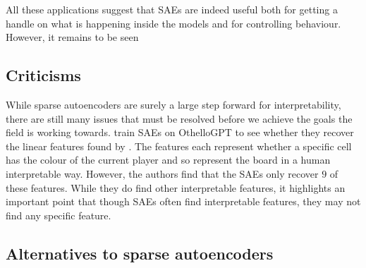 \documentclass[../../main.tex]{subfiles}
\begin{document}
All these applications suggest that SAEs are indeed useful both for getting a handle on what is happening inside the models and for controlling behaviour.
However, it remains to be seen 



\subsection{Criticisms}
While sparse autoencoders are surely a large step forward for interpretability, there are still many issues that must be resolved before we achieve the goals the field is working towards.
\citet{robert_huben_research_2024} train SAEs on OthelloGPT \citep{li_emergent_2023} to see whether they recover the linear features found by \citet{neel_nanda_actually_2023}.
The features each represent whether a specific cell has the colour of the current player and so represent the board in a human interpretable way.
However, the authors find that the SAEs only recover $9$ of these features.
While they do find other interpretable features, it highlights an important point that though SAEs often find interpretable features, they may not find any specific feature.



\subsection{Alternatives to sparse autoencoders}\label{sec:alternatives_to_saes}
\end{document}

